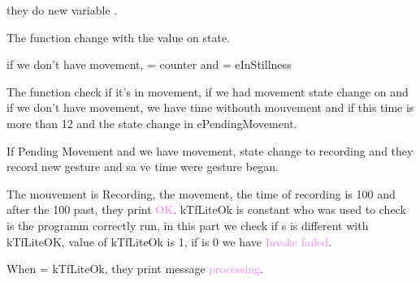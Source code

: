 they do new variable . 

The function  change with the value on state. 


if we don't have movement,  = counter and  = eInStillness 


\begin{center}
    \label{Magic Wand function}
\end{center}


The function  check if it's in movement, if we had movement state change on  and if we don't have movement, we have time withouth mouvement and if this time is more than 12  and the state change in ePendingMovement. 

\begin{center}
    \label{Magic Wand function}
\end{center}


If  Pending Movement and we have movement, state change to recording and they record new gesture and sa	ve time were gesture began. 


\begin{center}
    \label{Magic Wand function}
\end{center}


The mouvement is Recording, the movement, the time of recording is 100 and after the 100 past, they print \textcolor{violet}{OK}. 
kTfLiteOk is constant who was used to check is the programm correctly run, in this part we check if s is different with kTfLiteOK, value of kTfLiteOk is 1, if  is 0 we have \textcolor{violet}{Invoke failed}.

When = kTfLiteOk, they print message \textcolor{violet}{processing}.

\begin{center}
    \label{Magic Wand function}
\end{center}

